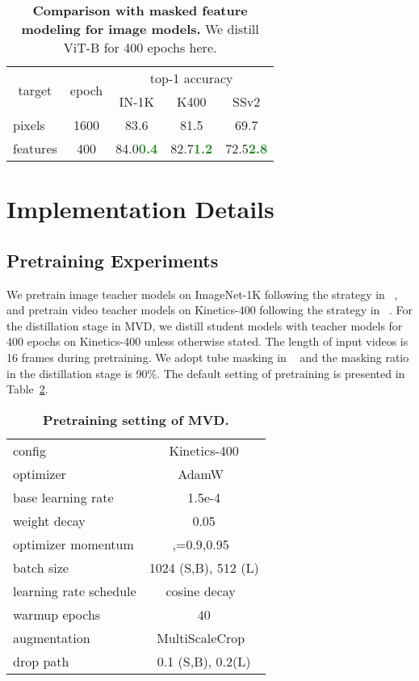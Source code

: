 \documentclass[10pt,twocolumn,letterpaper]{article}
\newcommand{\Up}[1]{\textcolor{ForestGreen}{\xspace\small{\bf #1}}}
\begin{document}
\begin{table}[h!]
\centering
\begin{tabular}{l|c|c|c|c}
\multicolumn{1}{c|}{\multirow{2}{*}{target}} & \multicolumn{1}{c|}{\multirow{2}{*}{epoch}} & \multicolumn{3}{c}{top-1 accuracy} \\
\cline{3-5} 
\multicolumn{1}{l|}{} & \multicolumn{1}{l|}{} & \multicolumn{1}{c|}{IN-1K} & \multicolumn{1}{c|}{K400}  & SSv2       \\ 
\shline
pixels & 1600 & 83.6 & 81.5 & 69.7   \\
features & 400 & 84.0\Up{0.4} & 82.7\Up{1.2} & 72.5\Up{2.8}  \\
\end{tabular}
\caption{\textbf{Comparison with masked feature modeling for image models.} We distill ViT-B for 400 epochs here.}
\label{tab:imagenet_vs_video}
\end{table}


\section{Implementation Details}

\subsection{Pretraining Experiments}

We pretrain image teacher models on ImageNet-1K following the strategy in ~\cite{he2021masked}, and pretrain video teacher models on Kinetics-400 following the strategy in ~\cite{tong2022videomae}. For the distillation stage in MVD, we distill student models with teacher models for 400 epochs on Kinetics-400 unless otherwise stated. The length of input videos is 16 frames during pretraining. We adopt tube masking in ~\cite{tong2022videomae} and the masking ratio in the distillation stage is 90\%. The default setting of pretraining is presented in Table~\ref{tab:pretraining_setting}. 


\begin{table}[h]
\centering
\begin{tabular}{l|c}
config & Kinetics-400 \\
\shline
optimizer & AdamW~\cite{adamw}   \\
base learning rate & 1.5e-4    \\
weight decay & 0.05 \\
optimizer momentum & ,=0.9,0.95~\cite{chen2020generative} \\
batch size & 1024 (S,B), 512 (L) \\
learning rate schedule & cosine decay~\cite{coslr} \\
warmup epochs & 40 \\
augmentation & MultiScaleCrop~\cite{tsn} \\
drop path & 0.1 (S,B), 0.2(L) \\
\end{tabular}
\caption{\textbf{Pretraining setting of MVD.}}
\label{tab:pretraining_setting}
\end{table}
\end{document}
